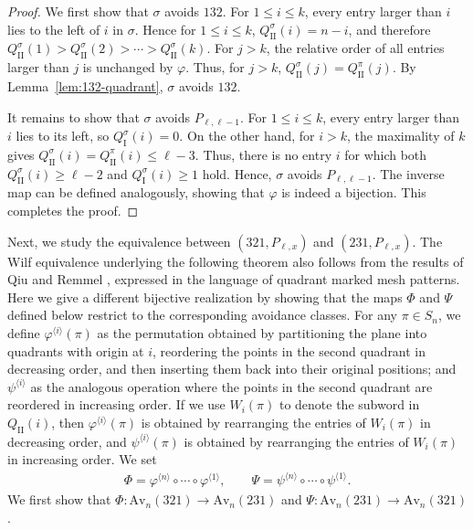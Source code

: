 \documentclass[11pt]{article}
\begin{document}
\begin{proof}
We first show that $\sigma$ avoids $132$. For $1\leq i\leq k$, every
entry larger than $i$ lies to the left of $i$ in $\sigma$. Hence for $1\leq i\leq k$,
$Q_{\mathrm{II}}^\sigma(i)=n-i$,
and therefore
$Q_{\mathrm{II}}^\sigma(1)>
Q_{\mathrm{II}}^\sigma(2)>
\cdots>
Q_{\mathrm{II}}^\sigma(k)$.
For $j>k$, the relative order of all entries larger than $j$ is
unchanged by $\varphi$. Thus, for $j>k$,
$Q_{\mathrm{II}}^\sigma(j)
=
Q_{\mathrm{II}}^\pi(j)$.
By Lemma~\ref{lem:132-quadrant}, $\sigma$ avoids $132$.

It remains to show that $\sigma$ avoids $P_{\ell,\ell-1}$. 
For $1\leq i\leq k$, every entry larger than $i$ lies to its left, so
$Q_{\mathrm{I}}^\sigma(i)=0$.
On the other hand, for $i>k$, the maximality of $k$ gives
$Q_{\mathrm{II}}^\sigma(i)=Q_{\mathrm{II}}^\pi(i)\leq\ell-3$.
Thus, there is no entry $i$ for which both
$Q_{\mathrm{II}}^\sigma(i)\geq\ell-2$ and
$Q_{\mathrm{I}}^\sigma(i)\geq1$ hold. 
Hence, $\sigma$ avoids $P_{\ell,\ell-1}$.
The inverse map can be defined analogously, showing that $\varphi$ is indeed a bijection.
This completes the proof.
\end{proof}

Next, we study the equivalence between $(321,P_{\ell,x})$ and $(231,P_{\ell,x})$.
The Wilf equivalence underlying the following theorem also follows from
the results of Qiu and Remmel \cite{QiuRemmel2018},
expressed in the language of quadrant marked mesh patterns. 
Here we give a different bijective realization by showing that the maps $\Phi$ and
$\Psi$ defined below restrict to the corresponding avoidance classes.
For any $\pi\in S_n$, we define $\varphi^{\langle i\rangle}(\pi)$ as the permutation obtained
by partitioning the plane into quadrants with origin at $i$,
reordering the points in the second quadrant in decreasing order, and then inserting them
back into their original positions; and $\psi^{\langle i\rangle}$
as the analogous operation where the points in the second quadrant are reordered in increasing order. 
If we use $W_i(\pi)$ to denote the subword in $Q_{\mathrm{II}}(i)$, 
then $\varphi^{\langle i\rangle}(\pi)$ is obtained by rearranging the entries of $W_i(\pi)$ in decreasing order, and $\psi^{\langle i\rangle}(\pi)$ is obtained by rearranging the entries of $W_i(\pi)$ in increasing order.
We set
\begin{align*}
  \Phi=\varphi^{\langle n\rangle}\circ\cdots\circ\varphi^{\langle 1 \rangle},\quad\quad\Psi=\psi^{\langle n\rangle}\circ\cdots\circ\psi^{\langle 1\rangle}.
\end{align*}
We first show that $\Phi:\text{Av}_n(321)\to \text{Av}_n(231)$ and 
$\Psi:\text{Av}_n(231)\to\text{Av}_n(321)$.
\end{document}
